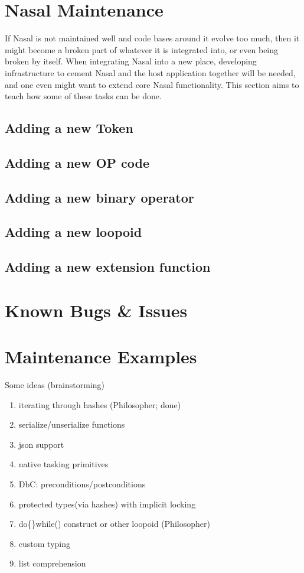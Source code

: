 \documentclass{article}
\newcommand{\todo}[1]{}
\begin{document}
\section{Nasal Maintenance}
If Nasal is not maintained well and code bases around it evolve too much, then it might become a broken part of whatever it is integrated into, or even being broken by itself.  When integrating Nasal into a new place, developing infrastructure to cement Nasal and the host application together will be needed, and one even might want to extend core Nasal functionality.  This section aims to teach how some of these tasks can be done.
\todo{to be written}
\subsection{Adding a new Token}
\subsection{Adding a new OP code}
\subsection{Adding a new binary operator}
\subsection{Adding a new loopoid}
\subsection{Adding a new extension function}

\section{Known Bugs \& Issues}
\todo{see FIXMEs, TODO in source code}

\section{Maintenance Examples}
Some ideas (brainstorming)
\begin{enumerate}
 \item iterating through hashes (Philosopher; done)
 \item serialize/unserialize functions
 \item json support
 \item native tasking primitives
 \item DbC: preconditions/postconditions
 \item protected types(via hashes) with implicit locking
 \item do\{\}while() construct or other loopoid (Philosopher)
 \item custom typing
 \item list comprehension
\end{enumerate}
\end{document}

